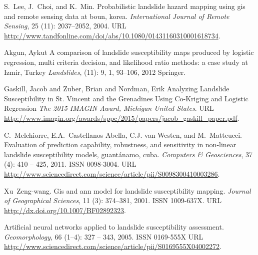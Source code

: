 \documentclass[11pt,twoside]{rmta2010esp}%
\begin{document}
\begin{thebibliography}{99}
S.~Lee, J.~Choi, and K.~Min.
\newblock Probabilistic landslide hazard mapping using gis and remote sensing
  data at boun, korea.
\newblock \emph{International Journal of Remote Sensing}, 25
  (11): 2037--2052, 2004.
\newblock URL
  \url{http://www.tandfonline.com/doi/abs/10.1080/01431160310001618734}.
  
  
  

Akgun, Aykut
\newblock A comparison of landslide susceptibility maps produced by logistic regression, multi criteria decision, and likelihood ratio methods: a case study at Izmir, Turkey
\newblock \emph{Landslides},
  (11): 9, 1, 93--106, 2012
\newblock Springer. 


Gaskill, Jacob and Zuber, Brian and Nordman, Erik
\newblock Analyzing Landslide Susceptibility in St. Vincent and the Grenadines Using Co-Kriging and Logistic Regression
\newblock \emph{The 2015 IMAGIN Award, Michigan United States}.
\newblock URL
  \url{http://www.imagin.org/awards/sppc/2015/papers/jacob_gaskill_paper.pdf}.
  
  
  

C.~Melchiorre, E.A.~Castellanos Abella, C.J. van Westen, and M.~Matteucci.
\newblock Evaluation of prediction capability, robustness, and sensitivity in
  non-linear landslide susceptibility models, guantánamo, cuba.
\newblock \emph{Computers {\&} Geosciences}, 37 (4): 410 --
  425, 2011.
\newblock ISSN 0098-3004.
\newblock URL
  \url{http://www.sciencedirect.com/science/article/pii/S0098300410003286}.

Xu~Zeng-wang.
\newblock Gis and ann model for landslide susceptibility mapping.
\newblock \emph{Journal of Geographical Sciences}, 11 (3):
  374--381, 2001.
\newblock ISSN 1009-637X.
\newblock URL \url{http://dx.doi.org/10.1007/BF02892323}.


Artificial neural networks applied to landslide susceptibility assessment.
\newblock \emph{Geomorphology}, 66 (1–4): 327 -- 343, 2005.
\newblock ISSN 0169-555X
\newblock URL \url{http://www.sciencedirect.com/science/article/pii/S0169555X04002272}.




\end{thebibliography}
\end{document}
